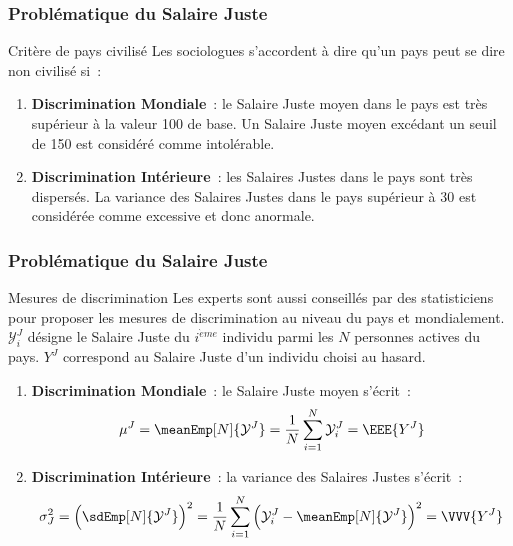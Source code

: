 \documentclass[11pt]{beamer}
\begin{document}
\begin{frame}
\frametitle{Problématique du Salaire Juste}

\begin{alertblock}{Critère de pays civilisé}
Les sociologues s'accordent à dire qu'un pays peut se dire non civilisé si~:
\begin{enumerate} 
\item \textbf{Discrimination Mondiale}~: le Salaire Juste moyen dans le pays est très supérieur à  la valeur 100 de base. Un Salaire Juste moyen excédant un seuil de 150 est considéré comme intolérable.
\item \textbf{Discrimination Intérieure}~: les Salaires Justes dans le pays sont très dispersés. La variance des Salaires Justes dans le pays supérieur à 30 est considérée comme excessive et donc anormale.
\end{enumerate}
\end{alertblock}
\end{frame}


\begin{frame}
\frametitle{Problématique du Salaire Juste}

\begin{alertblock}{Mesures de discrimination}
Les experts sont aussi conseillés par des statisticiens pour proposer les mesures de discrimination au niveau du pays et mondialement. $\mathcal{Y}^{J}_i$ désigne le Salaire Juste du $i^{\grave eme}$ individu parmi les $N$ personnes actives du pays. $Y^{J}$ correspond au Salaire Juste d'un individu choisi au hasard.
\begin{enumerate} 
\item \textbf{Discrimination Mondiale}~:  le Salaire Juste moyen s'écrit~:
$$\mu^{J}=\meanEmp[N]{\mathcal{Y}^{J}}=\frac1N\sum_{i=1}^N \mathcal{Y}^{J}_i=\EEE{Y^{J}}$$
\item \textbf{Discrimination Intérieure}~: la variance des Salaires Justes s'écrit~:
$$\sigma^2_{J}=\Big(\sdEmp[N]{\mathcal{Y}^{J}}\Big)^2=\frac1N\sum_{i=1}^N \Big(\mathcal{Y}^{J}_i-\meanEmp[N]{\mathcal{Y}^{J}}\Big)^2=\VVV{Y^{J}}$$
\end{enumerate}
\end{alertblock}
\end{frame}
\end{document}
